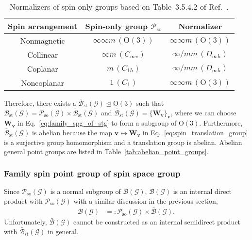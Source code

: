 \begin{table}[tb]
  \centering
  \caption{
    Normalizers of spin-only groups based on Table~3.5.4.2 of Ref.~\cite{koch2016normalizers}.
  }
  \label{tab:spin_only_normalizers}
  \begin{tabular}{ccc}
    \hline \hline
    Spin arrangement & Spin-only group $\mathcal{P}_{\mathrm{so}}$ & Normalizer \\
    \hline
    Nonmagnetic & $\infty \infty m \,(\mathrm{O}(3))$ & $\infty \infty m \,(\mathrm{O}(3))$ \\
    Collinear & $\infty m \,(C_{\infty v})$ & $\infty / mm \, (D_{\infty h})$ \\
    Coplanar & $m \,(C_{1h})$ & $\infty / mm \, (D_{\infty h})$ \\
    Noncoplanar & $1 \, (C_{1})$ & $\infty \infty m \,(\mathrm{O}(3))$ \\
    \hline \hline
  \end{tabular}
\end{table}

Therefore, there exists a  $\bar{\mathcal{B}}_{\mathrm{st}}(\mathcal{G}) \trianglelefteq \mathrm{O}(3)$ such that $\mathcal{B}_{\mathrm{st}}(\mathcal{G}) = \mathcal{P}_{\mathrm{so}}(\mathcal{G}) \times \bar{\mathcal{B}}_{\mathrm{st}}(\mathcal{G})$ and $\bar{\mathcal{B}}_{\mathrm{st}}(\mathcal{G}) = \{ \bm{W}_{\bm{v}} \}_{\bm{v}}$, where we can choose $\bm{W}_{\bm{v}}$ in Eq.~\eqref{eq:family_spg_of_stg} to form a subgroup of $\mathrm{O}(3)$.
Furthermore, $\bar{\mathcal{B}}_{\mathrm{st}}(\mathcal{G})$ is abelian because the map $\bm{v} \mapsto \bm{W}_{\bm{v}}$ in Eq.~\eqref{eq:spin_translation_group} is a surjective group homomorphism and a translation group is abelian.
Abelian general point groups are listed in Table~\ref{tab:abelian_point_groups}.

\subsubsection{\label{sec:family_spin_point_group}Family spin point group of spin space group}

Since $\mathcal{P}_{\mathrm{so}}(\mathcal{G})$ is a normal subgroup of $\mathcal{B}(\mathcal{G})$, $\mathcal{B}(\mathcal{G})$ is an internal direct product with $\mathcal{P}_{\mathrm{so}}(\mathcal{G})$ with a similar discussion in the previous section,
\begin{align}
  \mathcal{B}(\mathcal{G})
    &=: \mathcal{P}_{\mathrm{so}}(\mathcal{G}) \times \bar{\mathcal{B}}(\mathcal{G}).
\end{align}
Unfortunately, $\bar{\mathcal{B}}(\mathcal{G})$ cannot be constructed as an internal semidirect product with $\bar{\mathcal{B}}_{\mathrm{st}}(\mathcal{G})$ in general.

